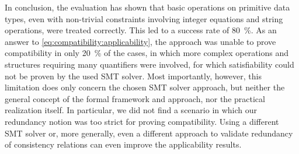 
In conclusion, the evaluation has shown that basic operations on primitive data types, even with non-trivial constraints involving integer equations and string operations, were treated correctly.
This led to a success rate of \SI{80}{\percent}.
As an answer to \autoref{eq:compatibility:applicability}, the approach was unable to prove compatibility in only \SI{20}{\percent} of the cases, in which more complex operations and structures requiring many quantifiers were involved, for which satisfiability could not be proven by the used \gls{SMT} solver.
Most importantly, however, this limitation does only concern the chosen \gls{SMT} solver approach, but neither the general concept of the formal framework and approach, nor the practical realization itself.
In particular, we did not find a scenario in which our redundancy notion was too strict for proving compatibility.
Using a different \gls{SMT} solver or, more generally, even a different approach to validate redundancy of consistency relations can even improve the applicability results.



